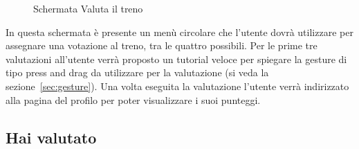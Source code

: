 \begin{figure}[htp]
    \caption{Schermata Valuta il treno}
    \label{fig:valutaTreno}
\end{figure}

In questa schermata è presente un menù circolare che l'utente dovrà utilizzare per assegnare una votazione al treno, tra le quattro possibili.
Per le prime tre valutazioni all'utente verrà proposto un tutorial veloce per spiegare la gesture di tipo press and drag da utilizzare per la valutazione (si veda la sezione~\vref{sec:gesture}). Una volta eseguita la valutazione l'utente verrà indirizzato alla pagina del profilo per poter visualizzare i suoi punteggi.

\subsection{Hai valutato}

